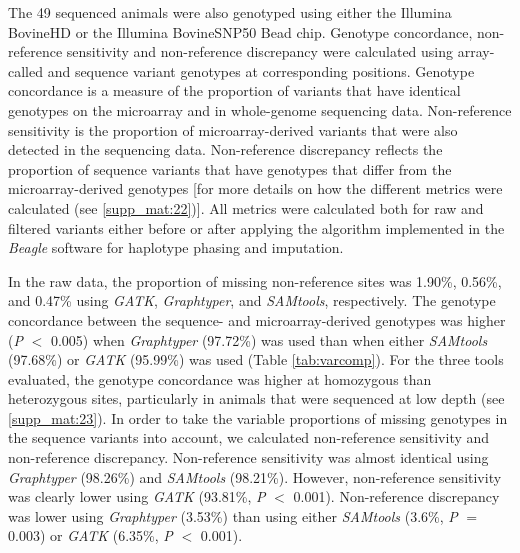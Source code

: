 \documentclass[../main.tex]{subfiles}
\begin{document}
The 49 sequenced animals were also genotyped using either the Illumina BovineHD or the Illumina BovineSNP50 Bead chip. 
Genotype concordance, non-reference sensitivity and non-reference discrepancy were calculated using array-called and 
sequence variant genotypes at corresponding positions. Genotype concordance is a measure of the proportion of variants that have
identical genotypes on the microarray and in whole-genome sequencing data. 
Non-reference sensitivity is the proportion of microarray-derived variants that were also detected in the sequencing data. 
Non-reference discrepancy reflects the proportion of sequence variants that have genotypes that differ from the microarray-derived genotypes [for more details on how the different metrics were calculated (see \ref{supp_mat:22})]. 
All metrics were calculated both for raw and filtered variants either before or after applying the algorithm implemented in the \emph{Beagle} software for haplotype phasing and imputation.

In the raw data, the proportion of missing non-reference sites was 1.90\%, 0.56\%, and 0.47\% using \emph{GATK}, \emph{Graphtyper}, and \emph{SAMtools}, respectively.
The genotype concordance between the sequence- and microarray-derived genotypes was higher (\emph{P} $<$ 0.005) when \emph{Graphtyper} (97.72\%) was used than when either \emph{SAMtools} (97.68\%) or \emph{GATK} (95.99\%) was used (Table \ref{tab:varcomp}). 
For the three tools evaluated, the genotype concordance was higher at homozygous than heterozygous sites, particularly in animals that were sequenced at low depth (see \ref{supp_mat:23}).
In order to take the variable proportions of missing genotypes in the sequence variants into account, we calculated non-reference sensitivity and non-reference discrepancy. 
Non-reference sensitivity was almost identical using \emph{Graphtyper} (98.26\%) and \emph{SAMtools} (98.21\%). 
However, non-reference sensitivity was clearly lower using \emph{GATK} (93.81\%, \emph{P} $<$ 0.001). 
Non-reference discrepancy was lower using \emph{Graphtyper} (3.53\%) than using either \emph{SAMtools} (3.6\%, \emph{P} $=$ 0.003) or \emph{GATK} (6.35\%, \emph{P} $<$ 0.001).
\end{document}
